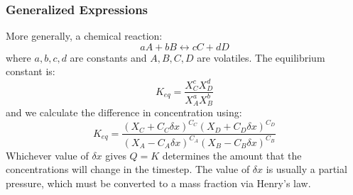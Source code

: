 

\subsubsection{Generalized Expressions}
More generally, a chemical reaction: 
\begin{equation}
    aA + bB \leftrightarrow cC + dD
\end{equation}
where $a,b,c,d$ are constants and $A,B,C,D$ are volatiles.  The equilibrium constant is: 
\begin{equation}
    K_{eq} = \frac{X_C^c X_D^d}{X_A^a X_B^b}
\end{equation}
and we calculate the difference in concentration using: 
\begin{equation}
K_{eq} = \frac{(X_C + C_C\delta x)^{C_C} (X_D + C_D\delta x)^{C_D}}{(X_A-C_A\delta x)^{C_A} (X_B-C_B\delta x)^{C_B}}
\end{equation}
Whichever value of $\delta x$ gives $Q=K$ determines the amount that the concentrations will change in the timestep. The value of $\delta x$ is usually a partial pressure, which must be converted to a mass fraction via Henry's law. 
